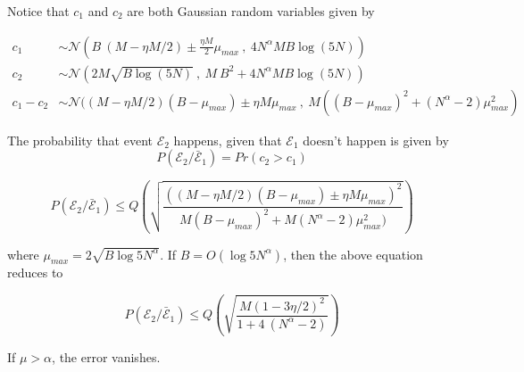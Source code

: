 Notice that $c_1$ and $c_2$ are both Gaussian random variables given by

\[ \begin{array}{ll}
c_1 &\sim  \mathcal{N}(B ~ (M-\eta M/2) \pm \frac{\eta M}{2} \mu_{max} \ , \ 4N^\alpha M B \log(5N)) \\
c_2 &\sim  \mathcal{N}(2M \sqrt{B\log(5N)}\ , \ M~B^2 + 4N^\alpha M B \log(5N))\\
c_1 - c_2 &\sim  \mathcal{N}((M-\eta M/2)(B-\mu_{max}) \pm \eta M \mu_{max} \ , \ M((B-\mu_{max})^2 + (N^{\alpha}-2)\mu_{max}^2)
\end{array}\]

The probability that event $\mathcal{E}_2$ happens, given that $\mathcal{E}_1$ doesn't happen is given by
\[ P(\mathcal{E}_2 / \bar{\mathcal{E}}_1 ) = Pr(c_2 > c_1) \]



\[ P(\mathcal{E}_2 / \bar{\mathcal{E}}_1 ) \leq Q \left( \sqrt{\frac{((M-\eta M/2)(B-\mu_{max}) \pm \eta M \mu_{max})^2}{M(B-\mu_{max})^2 + M(N^{\alpha}-2)\mu_{max}^2)}} \right) \]

where $\mu_{max} = 2\sqrt{B \log 5 N^{\alpha}} $. If $B = O(\log 5 N^{\alpha})$, then the above equation reduces to

\[ P(\mathcal{E}_2 / \bar{\mathcal{E}}_1 ) \leq Q \left( \sqrt{\frac{M(1-3\eta/2)^2}{1 + 4~ (N^{\alpha}-2)}} \right) \]

If $\mu > \alpha$, the error vanishes.